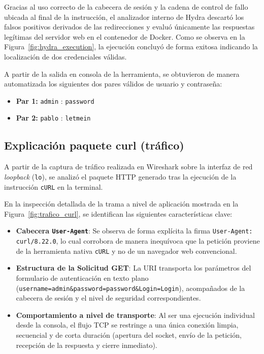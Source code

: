 \documentclass[letter,12pt]{article}
\begin{document}
Gracias al uso correcto de la cabecera de sesión y la cadena de control de fallo ubicada al final de la instrucción, el analizador interno de Hydra descartó los falsos positivos derivados de las redirecciones y evaluó únicamente las respuestas legítimas del servidor web en el contenedor de Docker. Como se observa en la Figura~\ref{fig:hydra_execution}, la ejecución concluyó de forma exitosa indicando la localización de dos credenciales válidas.

A partir de la salida en consola de la herramienta, se obtuvieron de manera automatizada los siguientes dos pares válidos de usuario y contraseña:
\begin{itemize}
    \item \textbf{Par 1:} \texttt{admin} : \texttt{password}
    \item \textbf{Par 2:} \texttt{pablo} : \texttt{letmein}
\end{itemize}

\subsection{Explicación paquete curl (tráfico)}

A partir de la captura de tráfico realizada en Wireshark sobre la interfaz de red \textit{loopback} (\texttt{lo}), se analizó el paquete HTTP generado tras la ejecución de la instrucción \texttt{cURL} en la terminal. 

En la inspección detallada de la trama a nivel de aplicación mostrada en la Figura~\ref{fig:trafico_curl}, se identifican las siguientes características clave:
\begin{itemize}
    \item \textbf{Cabecera \texttt{User-Agent}}: Se observa de forma explícita la firma \texttt{User-Agent: curl/8.22.0}, lo cual corrobora de manera inequívoca que la petición proviene de la herramienta nativa \texttt{cURL} y no de un navegador web convencional.
    \item \textbf{Estructura de la Solicitud GET}: La URI transporta los parámetros del formulario de autenticación en texto plano (\texttt{username=admin\&password=password\&Login=Login}), acompañados de la cabecera de sesión y el nivel de seguridad correspondientes.
    \item \textbf{Comportamiento a nivel de transporte}: Al ser una ejecución individual desde la consola, el flujo TCP se restringe a una única conexión limpia, secuencial y de corta duración (apertura del socket, envío de la petición, recepción de la respuesta y cierre inmediato).
\end{itemize}
\end{document}
